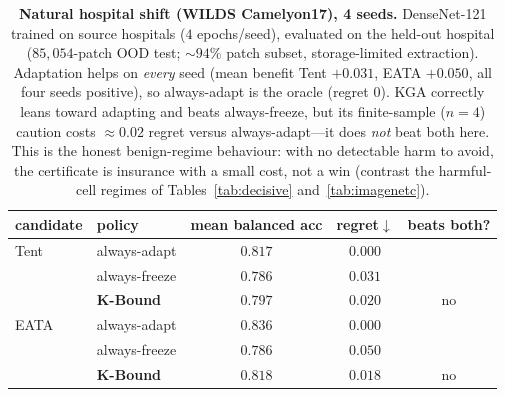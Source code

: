 \documentclass[conference]{IEEEtran}
\theoremstyle{plain}
\theoremstyle{definition}
\begin{document}
\begin{table}[t]\centering\small
\begin{tabular}{llccc}
\toprule
candidate & policy & mean balanced acc & regret$\downarrow$ & beats both? \\
\midrule
Tent & always-adapt    & $0.817$ & $\mathbf{0.000}$ & \\
     & always-freeze   & $0.786$ & $0.031$ & \\
     & \textbf{K-Bound} & $0.797$ & $0.020$ & no \\
\midrule
EATA & always-adapt    & $0.836$ & $\mathbf{0.000}$ & \\
     & always-freeze   & $0.786$ & $0.050$ & \\
     & \textbf{K-Bound} & $0.818$ & $0.018$ & no \\
\bottomrule
\end{tabular}
\caption{\textbf{Natural hospital shift (WILDS Camelyon17), 4 seeds.} DenseNet-121 trained on
source hospitals ($4$ epochs/seed), evaluated on the held-out hospital ($85{,}054$-patch OOD
test; $\sim\!94\%$ patch subset, storage-limited extraction). Adaptation helps on \emph{every}
seed (mean benefit Tent $+0.031$, EATA $+0.050$, all four seeds positive), so always-adapt is
the oracle (regret $0$). \textsc{KGA} correctly leans toward adapting and beats always-freeze,
but its finite-sample ($n{=}4$) caution costs $\approx\!0.02$ regret versus always-adapt---it
does \emph{not} beat both here. This is the honest benign-regime behaviour: with no detectable
harm to avoid, the certificate is insurance with a small cost, not a win (contrast the
harmful-cell regimes of Tables~\ref{tab:decisive} and~\ref{tab:imagenetc}).}
\label{tab:camelyon}
\end{table}
\end{document}

